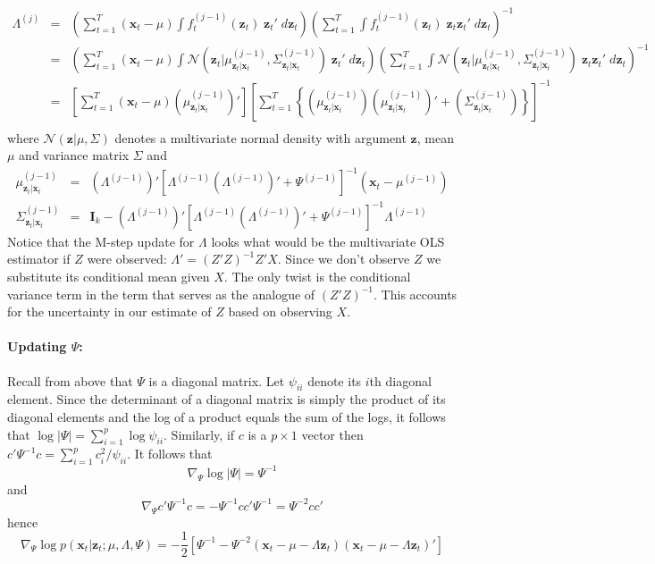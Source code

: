 \documentclass[12pt]{article}
\theoremstyle{definition}
\begin{document}
	\begin{eqnarray*}
		\Lambda^{(j)} &=& \left(\sum_{t = 1}^T  (\textbf{x}_t - \mu)\int f_t^{(j-1)}(\mathbf{z}_t) \; \textbf{z}_t' \; d \mathbf{z}_t\right) \left(\sum_{t=1}^T \int f_t^{(j-1)}(\mathbf{z}_t)\; \textbf{z}_t \textbf{z}_t' \; d \mathbf{z}_t\right)^{-1}\\
			&=&\left(\sum_{t = 1}^T  (\textbf{x}_t - \mu)\int \mathcal{N}\left(\mathbf{z}_t|\mu^{(j-1)}_{\mathbf{z}_t|\mathbf{x}_t}, \Sigma^{(j-1)}_{\mathbf{z}_t|\mathbf{x}_t}\right) \; \textbf{z}_t' \; d \mathbf{z}_t\right) \left(\sum_{t=1}^T \int \mathcal{N}\left(\mathbf{z}_t|\mu^{(j-1)}_{\mathbf{z}_t|\mathbf{x}_t}, \Sigma^{(j-1)}_{\mathbf{z}_t|\mathbf{x}_t}\right)\; \textbf{z}_t \textbf{z}_t' \; d \mathbf{z}_t\right)^{-1}\\
			&=& \left[\sum_{t=1}^T (\mathbf{x}_t - \mu)\left(\mu^{(j-1)}_{\mathbf{z}_t|\mathbf{x}_t} \right)'\right]\left[\sum_{t=1}^T \left\{ \left(\mu^{(j-1)}_{\mathbf{z}_t|\mathbf{x}_t} \right)\left(\mu^{(j-1)}_{\mathbf{z}_t|\mathbf{x}_t} \right)' + \left(\Sigma^{(j-1)}_{\mathbf{z}_t|\mathbf{x}_t} \right) \right\}  \right]^{-1}\\
	\end{eqnarray*}
where $\mathcal{N}(\mathbf{z}|\mu, \Sigma)$ denotes a multivariate normal density with argument $\mathbf{z}$, mean $\mu$ and variance matrix $\Sigma$ and
	\begin{eqnarray*}
		\mu^{(j-1)}_{\mathbf{z}_t|\mathbf{x}_t} &=& \left(\Lambda^{(j-1)}\right)' \left[\Lambda^{(j-1)} \left(\Lambda^{(j-1)}\right)' + \Psi^{(j-1)}\right]^{-1} \left(\mathbf{x}_t - \mu^{(j-1)}\right) \\
		\Sigma^{(j-1)}_{\mathbf{z}_t|\mathbf{x}_t}  &=& \mathbf{I}_k - \left(\Lambda^{(j-1)}\right)' \left[\Lambda^{(j-1)} \left(\Lambda^{(j-1)}\right)' + \Psi^{(j-1)}\right]^{-1}\Lambda^{(j-1)}
	\end{eqnarray*}
Notice that the M-step update for $\Lambda$ looks what would be the multivariate OLS estimator if $Z$ were observed: $\Lambda' = (Z'Z)^{-1}Z'X$. Since we don't observe $Z$ we substitute its conditional mean given $X$. The only twist is the conditional variance term in the term that serves as the analogue of $(Z'Z)^{-1}$. This accounts for the uncertainty in our estimate of $Z$ based on observing $X$.

\paragraph{Updating $\Psi$:} Recall from above that $\Psi$ is a diagonal matrix. Let $\psi_{ii}$ denote its $i$th diagonal element. Since the determinant of a diagonal matrix is simply the product of its diagonal elements and the log of a product equals the sum of the logs, it follows that $\log |\Psi| = \sum_{i=1}^p \log \psi_{ii}$. Similarly, if $c$ is a $p\times 1$ vector then $c' \Psi^{-1} c = \sum_{i=1}^p c_i^2/\psi_{ii}$. It follows that 
	$$\nabla_\Psi \log |\Psi| = \Psi^{-1}$$
and
	$$\nabla_\Psi c' \Psi^{-1} c = - \Psi^{-1} cc' \Psi^{-1} = \Psi^{-2} cc'$$
hence
	$$ \nabla_\Psi \log p(\textbf{x}_t| \textbf{z}_t;\mu, \Lambda, \Psi) = -\frac{1}{2} \left[ \Psi^{-1} - \Psi^{-2}(\mathbf{x}_t - \mu -  \Lambda \textbf{z}_t)(\mathbf{x}_t - \mu -  \Lambda \textbf{z}_t)' \right]$$
\end{document}
